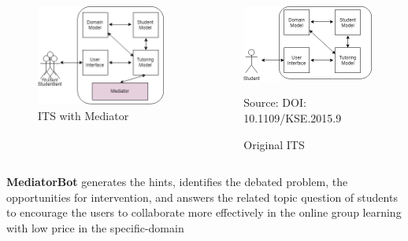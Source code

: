 \documentclass{beamer}
\begin{document}
\begin{frame}
\begin{columns}[onlytextwidth]
	\begin{column}{.45\textwidth}
		\begin{figure}
			\includegraphics[width=.8\textwidth]{pp1}

				\caption{ITS with Mediator}
		\end{figure}
	\end{column}
	\hfill
	\begin{column}{.45\textwidth}
		\begin{figure}
			\includegraphics[width=.8\textwidth]{pp2}
					\caption{Original ITS}
{\tiny 					Source: DOI: 10.1109/KSE.2015.9}
					
		\end{figure}
	\end{column}
\end{columns}
\begin{center}
	
\end{center}
\textbf{MediatorBot} generates the hints, identifies the debated problem, the opportunities for intervention, and answers the related topic question of students to encourage the users to collaborate more effectively in the online group learning with low price in the specific-domain
\end{frame}
\end{document}
